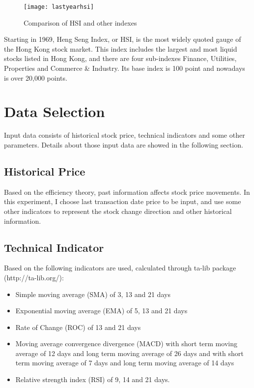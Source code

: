 \begin{figure}[h]
	\centering
	\texttt{[image: lastyearhsi]}
	\caption{Comparison of HSI and other indexes}
\end{figure}

Starting in 1969, Heng Seng Index, or HSI, is the most widely quoted gauge of the Hong Kong stock market\cite{hsi_company_profile}. This index includes the largest and most liquid stocks listed in Hong Kong, and there are four sub-indexes Finance, Utilities, Properties and Commerce \& Industry\cite{heng_seng_index}. Its base index is 100 point and nowadays is over 20,000 points.

\section{Data Selection}

Input data consists of historical stock price, technical indicators and some other parameters. Details about those input data are showed in the following section.

\subsection{Historical Price}
Based on the efficiency theory, past information affects stock price movements. In this experiment, I choose last transaction date price to be input, and use some other indicators to represent the stock change direction and other historical information.

\subsection{Technical Indicator}

Based on \cite{lauretto2013evaluation} the following indicators are used, calculated through ta-lib package (http://ta-lib.org/):
\begin{itemize}
	\item Simple moving average (SMA) of 3, 13 and 21 days
	\item Exponential moving average (EMA) of 5, 13 and 21 days
	\item Rate of Change (ROC) of 13 and 21 days
	\item Moving average convergence divergence (MACD) with short term moving average of 12 days and long term moving average of 26 days and with short term moving average of 7 days and long term moving average of 14 days
	\item Relative strength index (RSI) of 9, 14 and 21 days.
\end{itemize}

